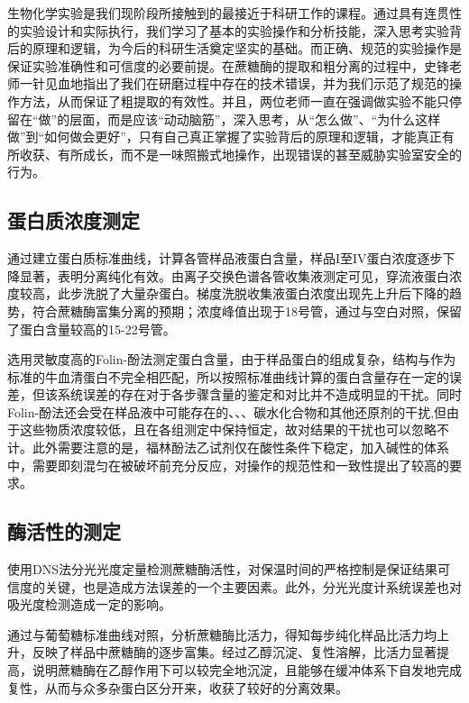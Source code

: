 生物化学实验是我们现阶段所接触到的最接近于科研工作的课程。通过具有连贯性的实验设计和实际执行，我们学习了基本的实验操作和分析技能，深入思考实验背后的原理和逻辑，为今后的科研生活奠定坚实的基础。而正确、规范的实验操作是保证实验准确性和可信度的必要前提。在蔗糖酶的提取和粗分离的过程中，史锋老师一针见血地指出了我们在研磨过程中存在的技术错误，并为我们示范了规范的操作方法，从而保证了粗提取的有效性。并且，两位老师一直在强调做实验不能只停留在“做”的层面，而是应该“动动脑筋”，深入思考，从“怎么做”、“为什么这样做”到“如何做会更好”，只有自己真正掌握了实验背后的原理和逻辑，才能真正有所收获、有所成长，而不是一味照搬式地操作，出现错误的甚至威胁实验室安全的行为。

\subsection{蛋白质浓度测定}
\par 通过建立蛋白质标准曲线，计算各管样品液蛋白含量，样品I至IV蛋白浓度逐步下降显著，表明分离纯化有效。由离子交换色谱各管收集液测定可见，穿流液蛋白浓度较高，此步洗脱了大量杂蛋白。梯度洗脱收集液蛋白浓度出现先上升后下降的趋势，符合蔗糖酶富集分离的预期；浓度峰值出现于18号管，通过与空白对照，保留了蛋白含量较高的15-22号管。
\par 选用灵敏度高的Folin-酚法测定蛋白含量，由于样品蛋白的组成复杂，结构与作为标准的牛血清蛋白不完全相匹配，所以按照标准曲线计算的蛋白含量存在一定的误差，但该系统误差的存在对于各步骤含量的鉴定和对比并不造成明显的干扰。同时Folin-酚法还会受在样品液中可能存在的、、、碳水化合物和其他还原剂的干扰,但由于这些物质浓度较低，且在各组测定中保持恒定，故对结果的干扰也可以忽略不计。此外需要注意的是，福林酚法乙试剂仅在酸性条件下稳定，加入碱性的体系中，需要即刻混匀在被破坏前充分反应，对操作的规范性和一致性提出了较高的要求。

\subsection{酶活性的测定}
\par 使用DNS法分光光度定量检测蔗糖酶活性，对保温时间的严格控制是保证结果可信度的关键，也是造成方法误差的一个主要因素。此外，分光光度计系统误差也对吸光度检测造成一定的影响。
\par 通过与葡萄糖标准曲线对照，分析蔗糖酶比活力，得知每步纯化样品比活力均上升，反映了样品中蔗糖酶的逐步富集。经过乙醇沉淀、复性溶解，比活力显著提高，说明蔗糖酶在乙醇作用下可以较完全地沉淀，且能够在缓冲体系下自发地完成复性，从而与众多杂蛋白区分开来，收获了较好的分离效果。

